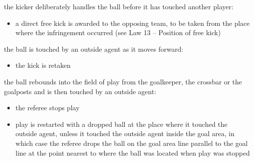 \bigskip

the kicker deliberately handles the ball before it has touched another
player:

\begin{itemize}
\item a direct free kick is awarded to the opposing team, to be taken from the
place where the infringement occurred (see Law 13 -- Position of free
kick)
\end{itemize}

\bigskip

the ball is touched by an outside agent as it moves forward:

\begin{itemize}
\item the kick is retaken
\end{itemize}

\bigskip

the ball rebounds into the field of play from the goalkeeper, the
crossbar or the goalposts and is then touched by an outside agent:

\begin{itemize}
\item the referee stops play
\item play is restarted with a dropped ball at the place where it touched the
outside agent, unless it touched the outside agent inside the goal area,
in which case the referee drops the ball on the goal area line parallel
to the goal line at the point nearest to where the ball was located
when play was stopped
\end{itemize}